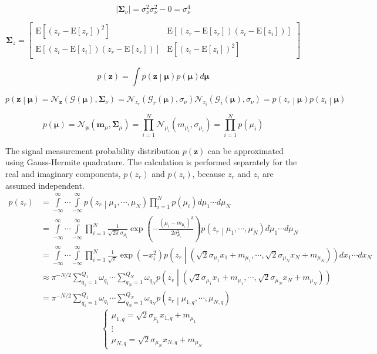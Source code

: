 \documentclass{article}         %
\theoremstyle{definition}
\theoremstyle{remark}
\newcommand{\eq}[1]{\begin{equation} #1 \end{equation}}
\newcommand{\al}[1]{\begin{align} #1 \end{align}}
\newcommand{\mbf}{\mathbf{m}}
\newcommand{\zbf}{\mathbf{z}}
\newcommand{\mubf}{\boldsymbol{\mu}}
\newcommand{\Sigmabf}{\boldsymbol{\Sigma}}
\newcommand{\Gscript}{\mathcal{G}}
\newcommand{\Nscript}{\mathcal{N}}
\newcommand{\paren}[1]{\left(#1\right)}
\newcommand{\arr}[2]{\begin{array}{#1} #2 \end{array}}
\newcommand{\expect}[1]{\mathrm{E}\left[#1\right]}
\newcommand{\intinfty}{\int\limits_{-\infty}^\infty}
\newcommand{\prodin}{\prod\limits_{i=1}^N}
\newcommand{\sumqone}{\sum\limits_{q_1=1}^{Q_1}}
\newcommand{\sumqN}{\sum\limits_{q_N=1}^{Q_N}}
\newcommand{\normpdf}[3]{\frac{1}{\sqrt{2\pi}#3}\exp\paren{-\frac{\paren{#1-#2}^2}{2#3^2}}}
\begin{document}
\eq{\lvert\mathbf{\Sigma}_\nu\rvert = \sigma_\nu^2\sigma_\nu^2-0 = \sigma_\nu^4}

\eq{\mathbf{\Sigma}_z = \left[ \begin{array}{cc}
	\mathrm{E}\left[\left(z_r - \expect{z_r}\right)^2\right] & \mathrm{E}\left[\left(z_r - \expect{z_r}\right)\left(z_i - \expect{z_i}\right)\right] \\
	\mathrm{E}\left[\left(z_i - \expect{z_i}\right)\left(z_r - \expect{z_r}\right)\right] & \mathrm{E}\left[\left(z_i - \expect{z_i}\right)^2\right] \end{array} \right]}

\eq{p\paren{\zbf} = \int p\paren{\zbf\middle|\mubf}p\paren{\mubf}d\mubf}

\eq{p\paren{\zbf\middle|\mubf} = \Nscript_\zbf\paren{\mathbf{\Gscript}\paren{\mubf},\Sigmabf_\nu} = \Nscript_{z_r}\paren{\Gscript_r\paren{\mubf},\sigma_\nu}\Nscript_{z_i}\paren{\Gscript_i\paren{\mubf},\sigma_\nu} = p\paren{z_r\middle|\mubf}p\paren{z_i\middle|\mubf}}

\eq{p\paren{\mubf} = \Nscript_{\mubf}\paren{\mbf_\mu,\Sigmabf_\mu} = \prodin\Nscript_{\mu_i}\paren{m_{\mu_i},\sigma_{\mu_i}} = \prodin p\paren{\mu_i}}

The signal measurement probability distribution $p\paren{\zbf}$ can be approximated using Gauss-Hermite quadrature. The calculation is performed separately for the real and imaginary components, $p\paren{z_r}$ and $p\paren{z_i}$, because $z_r$ and $z_i$ are assumed independent.
\al{p\paren{z_r} &= \intinfty\cdots\intinfty p\paren{z_r\middle|\mu_1,\cdots,\mu_N}\prodin p\paren{\mu_i}d\mu_1\cdots d\mu_N \\
&= \intinfty\cdots\intinfty\prodin\normpdf{\mu_i}{m_{\mu_i}}{\sigma_{\mu_i}}p\paren{z_r\middle|\mu_1,\cdots,\mu_N}d\mu_1\cdots d\mu_N \\
&= \intinfty\cdots\intinfty\prodin\frac{1}{\sqrt{\pi}}\exp\paren{-x_i^2}p\paren{z_r\middle|\paren{\sqrt{2}\sigma_{\mu_1} x_1+m_{\mu_1},\cdots,\sqrt{2}\sigma_{\mu_N} x_N+m_{\mu_N}}}dx_1\cdots dx_N \\
&\approx \pi^{-N/2}\sumqone\omega_{q_1}\cdots\sumqN\omega_{q_N}p\paren{z_r\middle|\paren{\sqrt{2}\sigma_{\mu_1} x_1+m_{\mu_1},\cdots,\sqrt{2}\sigma_{\mu_N} x_N+m_{\mu_N}}} \\
&= \pi^{-N/2}\sumqone\omega_{q_1}\cdots\sumqN\omega_{q_N}p\paren{z_r\middle|\mu_{1,q},\cdots,\mu_{N,q}}} 
\eq{\left\{\arr{l}{\mu_{1,q} = \sqrt{2}\sigma_{\mu_1}x_{1,q}+m_{\mu_1} \\ \vdots \\ \mu_{N,q} = \sqrt{2}\sigma_{\mu_N}x_{N,q}+m_{\mu_N}}\right.}
\end{document}
